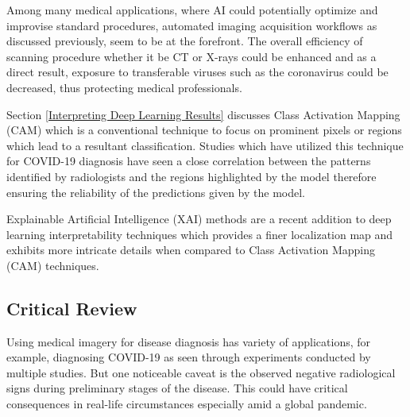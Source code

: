 Among many medical applications, where AI could potentially 
optimize and improvise standard procedures, automated 
imaging acquisition workflows as discussed previously, seem to be at the forefront. The overall efficiency of scanning procedure 
whether it be CT or X-rays could be enhanced and as a direct result, 
exposure to transferable viruses such as the coronavirus could be 
decreased, thus protecting medical professionals. 


Section \ref{Interpreting Deep Learning Results} discusses Class Activation Mapping (CAM) which is a conventional 
technique to focus on prominent pixels or regions which lead to a 
resultant classification. Studies which have utilized this technique 
for COVID-19 diagnosis have seen a close correlation between the patterns 
identified by radiologists and the regions highlighted by the model therefore 
ensuring the reliability of the predictions given by the model.

Explainable Artificial Intelligence (XAI) methods \cite{ADD+2020, FSA+2020} are a recent addition 
to deep learning interpretability techniques which provides a finer localization 
map and exhibits more intricate details when compared to 
Class Activation Mapping (CAM) techniques.
\subsection{Critical Review}

Using medical imagery for disease diagnosis has variety of applications, for example, 
diagnosing COVID-19 as seen through experiments conducted by multiple studies. But one noticeable caveat is the observed negative radiological signs during preliminary stages of the disease. This could have critical consequences in real-life circumstances especially amid a global pandemic.


